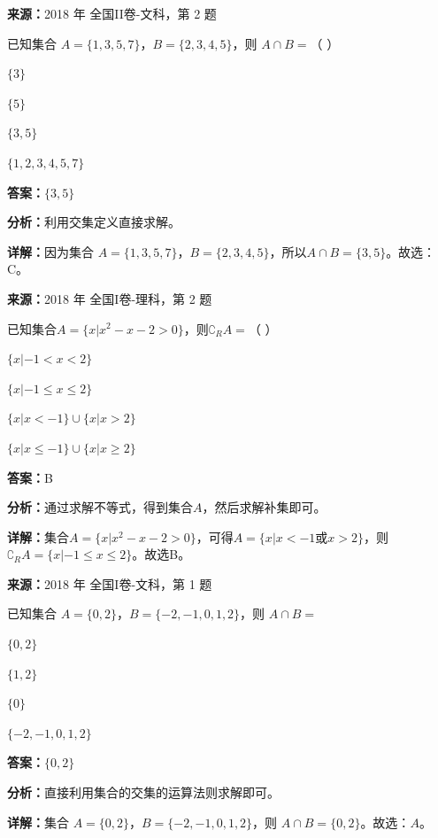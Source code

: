\begin{question}[points=5]
\textbf{来源：}2018 年 全国II卷-文科，第 2 题\par
已知集合 $A=\{1,3,5,7\}$，$B=\{2,3,4,5\}$，则 $A\cap B=$（ ）
\begin{choices}
  \item $\{3\}$
  \item $\{5\}$
  \item $\{3,5\}$
  \item $\{1,2,3,4,5,7\}$
\end{choices}
\begin{solution}
\textbf{答案：}$\{3,5\}$

\textbf{分析：}利用交集定义直接求解。

\textbf{详解：}因为集合 $A=\{1,3,5,7\}$，$B=\{2,3,4,5\}$，所以$A\cap B=\{3,5\}$。故选：C。
\end{solution}
\end{question}

\begin{question}[points=5]
\textbf{来源：}2018 年 全国I卷-理科，第 2 题\par
已知集合$A=\{x|x^2-x-2>0\}$，则$\complement_RA=$（    ）
\begin{choices}
  \item $\{x|-1<x<2\}$
  \item $\{x|-1\leq x\leq2\}$
  \item $\{x|x<-1\}\cup\{x|x>2\}$
  \item $\{x|x\leq-1\}\cup\{x|x\geq2\}$
\end{choices}
\begin{solution}
\textbf{答案：}B

\textbf{分析：}通过求解不等式，得到集合$A$，然后求解补集即可。

\textbf{详解：}集合$A=\{x|x^2-x-2>0\}$，可得$A=\{x|x<-1\text{或}x>2\}$，则$\complement_RA=\{x|-1\leq x\leq2\}$。故选B。
\end{solution}
\end{question}

\begin{question}[points=5]
\textbf{来源：}2018 年 全国I卷-文科，第 1 题\par
已知集合 $A=\{0,2\}$，$B=\{-2,-1,0,1,2\}$，则 $A\cap B=$
\begin{choices}
  \item $\{0,2\}$
  \item $\{1,2\}$
  \item $\{0\}$
  \item $\{-2,-1,0,1,2\}$
\end{choices}
\begin{solution}
\textbf{答案：}$\{0,2\}$

\textbf{分析：}直接利用集合的交集的运算法则求解即可。

\textbf{详解：}集合 $A=\{0,2\}$，$B=\{-2,-1,0,1,2\}$，则 $A\cap B=\{0,2\}$。故选：$A$。
\end{solution}
\end{question}

